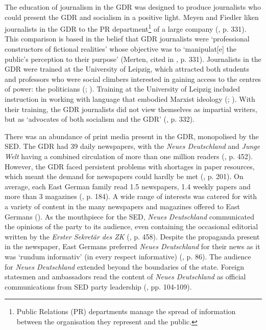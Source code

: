 The education of journalism in the GDR was designed to produce journalists who could present the GDR and socialism in a positive light. Meyen and Fiedler liken journalists in the GDR to the PR department\footnote{Public Relations (PR) departments manage the spread of information between the organisation they represent and the public.} of a large company (\citeyear{meyenfiedler2013}, p. 331). This comparison is based in the belief that GDR journalists were ‘professional constructors of fictional realities’ whose objective was to ‘manipulat[e] the public’s perception to their purpose’ (Merten, cited in \cite{meyenfiedler2013}, p. 331). Journalists in the GDR were trained at the University of Leipzig, which attracted both students and professors who were social climbers interested in gaining access to the centres of power: the politicians (\cite{meyenfiedler2013}; \cite{meyenwiedemann2017}). Training at the University of Leipzig included instruction in working with language that embodied Marxist ideology (\cite{holzweißig2002}; \cite{kurzmüllerpötschkepöttker2010}). With their training, the GDR journalists did not view themselves as impartial writers, but as ‘advocates of both socialism and the GDR’ (\cite{meyenfiedler2013}, p. 332).

There was an abundance of print media present in the GDR, monopolised by the SED. The GDR had 39 daily newspapers, with the \textit{Neues Deutschland} and \textit{Junge Welt} having a combined circulation of more than one million readers (\cite{fiedlermeyen2015}, p. 452). However, the GDR faced persistent problems with shortages in paper resources, which meant the demand for newspapers could hardly be met (\cite{dussel2011}, p. 201). On average, each East German family read 1.5 newspapers, 1.4 weekly papers and more than 3 magazines (\cite{hanke1990}, p. 184). A wide range of interests was catered for with a variety of content in the many newspapers and magazines offered to East Germans (\cite{meyen2003}). As the mouthpiece for the SED, \textit{Neues Deutschland} communicated the opinions of the party to its audience, even containing the occasional editorial written by the \textit{Erster Sekretär des ZK} (\cite{fiedlermeyen2015}, p. 458). Despite the propaganda present in the newspaper, East Germans preferred \textit{Neues Deutschland} for their news as it was ‘rundum informativ’ (in every respect informative) (\cite{meyenschweiger2008}, p. 86). The audience for \textit{Neues Deutschland} extended beyond the boundaries of the state. Foreign statesmen and ambassadors read the content of \textit{Neues Deutschland} as official communications from SED party leadership (\cite{fiedler2014}, pp. 104-109).

